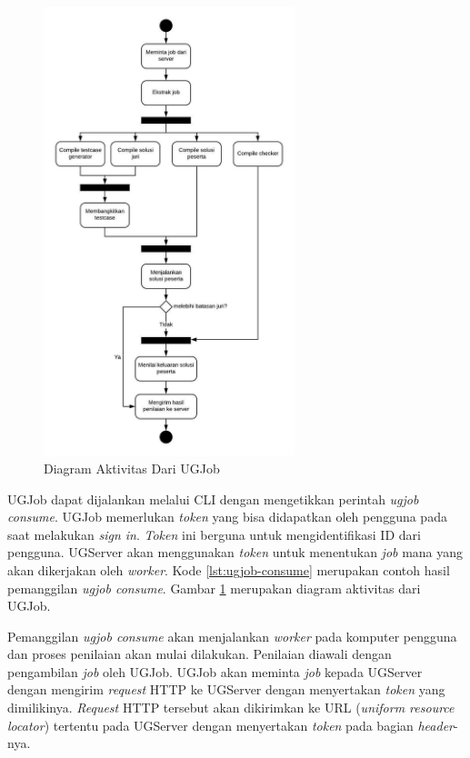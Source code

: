 \begin{figure}[ht!]
    \centering
    \includegraphics[width=0.65\textwidth]{images/job-activity}
    \caption{Diagram Aktivitas Dari UGJob}
    \label{fig:job-activity}
\end{figure}

\par UGJob dapat dijalankan melalui CLI dengan mengetikkan perintah \textit{ugjob consume}. UGJob memerlukan \textit{token} yang bisa didapatkan oleh pengguna pada saat melakukan \textit{sign in}. \textit{Token} ini berguna untuk mengidentifikasi ID dari pengguna. UGServer akan menggunakan \textit{token} untuk menentukan \textit{job} mana yang akan dikerjakan oleh \textit{worker}. Kode \ref{lst:ugjob-consume} merupakan contoh hasil pemanggilan \textit{ugjob consume}. Gambar \ref{fig:job-activity} merupakan diagram aktivitas dari UGJob.

\par Pemanggilan \textit{ugjob consume} akan menjalankan \textit{worker} pada komputer pengguna dan proses penilaian akan mulai dilakukan. Penilaian diawali dengan pengambilan \textit{job} oleh UGJob. UGJob akan meminta \textit{job} kepada UGServer dengan mengirim \textit{request} HTTP ke UGServer dengan menyertakan \textit{token} yang dimilikinya. \textit{Request} HTTP tersebut akan dikirimkan ke URL (\textit{uniform resource locator}) tertentu pada UGServer dengan menyertakan \textit{token} pada bagian \textit{header}-nya.

